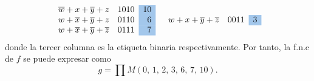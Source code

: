 \begin{myexample}
$$\begin{array}{llr}
        \overline{w}+x+\overline{y}+z & 1010 & \cellcolor{DodgerBlue3!40}{10} \\
        w+\overline{x}+\overline{y}+z & 0110 & \cellcolor{DodgerBlue3!40}{6} \\
        w+\overline{x}+\overline{y}+\overline{z} & 0111 & \cellcolor{DodgerBlue3!40}{7}
    \end{array} \quad \begin{array}{llr}
        w+x+\overline{y}+\overline{z} & 0011 & \cellcolor{DodgerBlue3!40}{3}
    \end{array}$$
    donde la tercer columna es la etiqueta binaria respectivamente. Por tanto, la f.n.c de $f$ se puede expresar como 
    $$\displaystyle g = \prod M(0, \, 1, \, 2, \, 3, \, 6, \, 7, \, 10).$$
\end{myexample}


